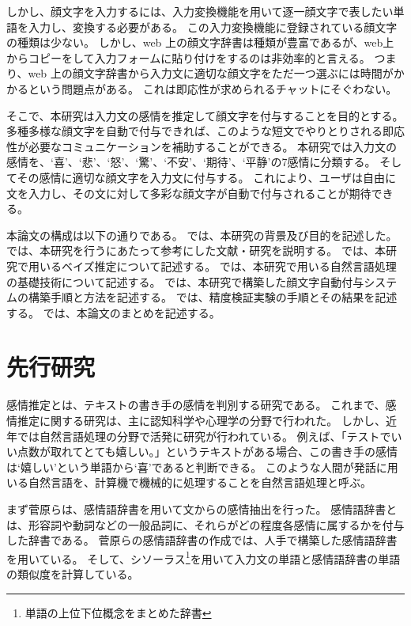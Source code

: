 \documentclass[11pt,a4j]{jsarticle}
\begin{document}
しかし、顔文字を入力するには、入力変換機能を用いて逐一顔文字で表したい単語を入力し、変換する必要がある。 
この入力変換機能に登録されている顔文字の種類は少ない。
しかし、web 上の顔文字辞書は種類が豊富であるが、web上からコピーをして入力フォームに貼り付けをするのは非効率的と言える。
つまり、web 上の顔文字辞書から入力文に適切な顔文字をただ一つ選ぶには時間がかかるという問題点がある。
これは即応性が求められるチャットにそぐわない。

そこで、本研究は入力文の感情を推定して顔文字を付与することを目的とする。
多種多様な顔文字を自動で付与できれば、このような短文でやりとりされる即応性が必要なコミュニケーションを補助することができる。
本研究では入力文の感情を、`喜'、`悲'、`怒'、`驚'、`不安'、`期待'、`平静'の7感情に分類する。
そしてその感情に適切な顔文字を入力文に付与する。
これにより、ユーザは自由に文を入力し、その文に対して多彩な顔文字が自動で付与されることが期待できる。

本論文の構成は以下の通りである。
 では、本研究の背景及び目的を記述した。
 では、本研究を行うにあたって参考にした文献・研究を説明する。
 では、本研究で用いるベイズ推定について記述する。
では、本研究で用いる自然言語処理の基礎技術について記述する。
では、本研究で構築した顔文字自動付与システムの構築手順と方法を記述する。
では、精度検証実験の手順とその結果を記述する。
では、本論文のまとめを記述する。

\section{先行研究}\label{sec:relatedworks}
感情推定とは、テキストの書き手の感情を判別する研究である。
これまで、感情推定に関する研究は、主に認知科学や心理学の分野で行われた。
しかし、近年では自然言語処理の分野で活発に研究が行われている。
例えば、「テストでいい点数が取れてとても嬉しい。」というテキストがある場合、この書き手の感情は`嬉しい'という単語から`喜'であると判断できる。
このような人間が発話に用いる自然言語を、計算機で機械的に処理することを自然言語処理と呼ぶ。

まず菅原らは、感情語辞書を用いて文からの感情抽出を行った。
感情語辞書とは、形容詞や動詞などの一般品詞に、それらがどの程度各感情に属するかを付与した辞書である。
菅原らの感情語辞書の作成では、人手で構築した感情語辞書を用いている。
そして、シソーラス\footnote{単語の上位下位概念をまとめた辞書}を用いて入力文の単語と感情語辞書の単語の類似度を計算している。
\end{document}
